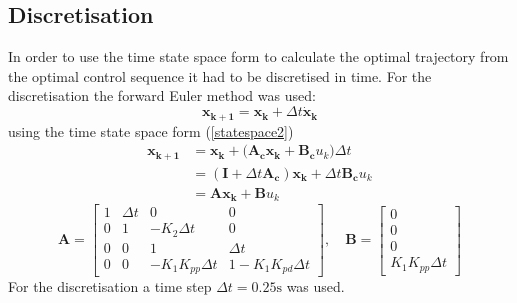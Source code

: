 \subsection{Discretisation}\label{sec:prob23}
In order to use the time state space form to calculate the optimal trajectory from the optimal control sequence it had to be discretised in time. For the discretisation the forward Euler method was used:
\begin{equation}
	\mathbf{x_{k+1}}= \mathbf{x_k}+ \Delta t \mathbf{\dot x_k}
\end{equation}
using the time state space form (\ref{statespace2})
\begin{align}
	\mathbf{x_{k+1}}&=\mathbf{x_k+ (A_cx_k+B_c}u_k) \Delta t \nonumber \\ 
			&=(\mathbf{I} + \Delta t\mathbf{ A_c})\mathbf{x_k}+\Delta t \mathbf{B_c}u_k \nonumber \\
			&=\mathbf{Ax_k+B}u_k
\end{align}
\begin{equation}
	\mathbf{A} =
	\begin{bmatrix}
				1 & \Delta t & 0 & 0 \\
				0 & 1 & -K_2\Delta t& 0 \\
				0 & 0 & 1 & \Delta t \\
				0 & 0 & -K_1K_{pp}\Delta t & 1-K_1K_{pd}\Delta t
	\end{bmatrix}, \quad
	\mathbf{B} =
	\begin{bmatrix}	
				0 \\
				0 \\
				0 \\
				K_1K_{pp}\Delta t			
	\end{bmatrix}
\end{equation}
For the discretisation a time step $\Delta t = 0.25 \mathrm{s}$ was used.

